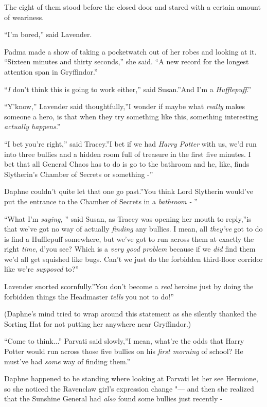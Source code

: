 The eight of them stood before the closed door and stared with a certain
amount of weariness.

``I'm bored,'' said Lavender.

Padma made a show of taking a pocketwatch out of her robes and looking
at it. ``Sixteen minutes and thirty seconds,'' she said. ``A new record
for the longest attention span in Gryffindor.''

``\emph{I} don't think this is going to work either,'' said Susan.''And
I'm a \emph{Hufflepuff}.''

``Y'know,'' Lavender said thoughtfully,''I wonder if maybe what
\emph{really} makes someone a hero, is that when they try something like
this, something interesting \emph{actually happens}.''

``I bet you're right,'' said Tracey.''I bet if we had \emph{Harry
Potter} with us, we'd run into three bullies and a hidden room full of
treasure in the first five minutes. I bet that all General Chaos has to
do is go to the bathroom and he, like, finds Slytherin's Chamber of
Secrets or something -''

Daphne couldn't quite let that one go past.''You think Lord Slytherin
would've put the entrance to the Chamber of Secrets in a \emph{bathroom
-} ''

``What I'm \emph{saying,} '' said Susan, as Tracey was opening her mouth
to reply,''is that we've got no way of actually \emph{finding} any
bullies. I mean, all \emph{they've} got to do is find a Hufflepuff
somewhere, but we've got to run across them at exactly the right
\emph{time}, d'you see? Which is a \emph{very good problem} because if
we \emph{did} find them we'd all get squished like bugs. Can't we just
do the forbidden third-floor corridor like we're \emph{supposed} to?''

Lavender snorted scornfully.''You don't become a \emph{real} heroine
just by doing the forbidden things the Headmaster \emph{tells} you not
to do!''

(Daphne's mind tried to wrap around this statement as she silently
thanked the Sorting Hat for not putting her anywhere near Gryffindor.)

``Come to think...'' Parvati said slowly,''I mean, what're the odds
that Harry Potter would run across those five bullies on his \emph{first
morning} of school? He must've had \emph{some} way of finding them.''

Daphne happened to be standing where looking at Parvati let her see
Hermione, so she noticed the Ravenclaw girl's expression change "--- and
then she realized that the Sunshine General had \emph{also} found some
bullies just recently -

